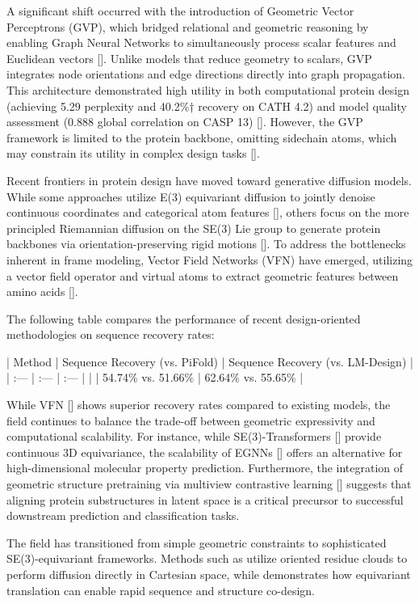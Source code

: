 \documentclass[11pt]{article}
\begin{document}
A significant shift occurred with the introduction of Geometric Vector Perceptrons (GVP), which bridged relational and geometric reasoning by enabling Graph Neural Networks to simultaneously process scalar features and Euclidean vectors [\citep{2009.01411}]. Unlike models that reduce geometry to scalars, GVP integrates node orientations and edge directions directly into graph propagation. This architecture demonstrated high utility in both computational protein design (achieving 5.29 perplexity and 40.2\%† recovery on CATH 4.2) and model quality assessment (0.888 global correlation on CASP 13) [\citep{2009.01411}]. However, the GVP framework is limited to the protein backbone, omitting sidechain atoms, which may constrain its utility in complex design tasks [\citep{2009.01411}].

Recent frontiers in protein design have moved toward generative diffusion models. While some approaches utilize E(3) equivariant diffusion to jointly denoise continuous coordinates and categorical atom features [\citep{2203.17003}], others focus on the more principled Riemannian diffusion on the SE(3) Lie group to generate protein backbones via orientation-preserving rigid motions [\citep{2302.02277}]. To address the bottlenecks inherent in frame modeling, Vector Field Networks (VFN) have emerged, utilizing a vector field operator and virtual atoms to extract geometric features between amino acids [\citep{2310.11802}].

The following table compares the performance of recent design-oriented methodologies on sequence recovery rates:

| Method | Sequence Recovery (vs. PiFold) | Sequence Recovery (vs. LM-Design) |
| :--- | :--- | :--- |
| \citep{2310.11802} | 54.74\% vs. 51.66\% | 62.64\% vs. 55.65\% |

While VFN [\citep{2310.11802}] shows superior recovery rates compared to existing models, the field continues to balance the trade-off between geometric expressivity and computational scalability. For instance, while SE(3)-Transformers [\citep{2006.10503}] provide continuous 3D equivariance, the scalability of EGNNs [\citep{2102.09844}] offers an alternative for high-dimensional molecular property prediction. Furthermore, the integration of geometric structure pretraining via multiview contrastive learning [\citep{2203.06125}] suggests that aligning protein substructures in latent space is a critical precursor to successful downstream prediction and classification tasks.

The field has transitioned from simple geometric constraints to sophisticated SE(3)-equivariant frameworks. Methods such as \citep{2301.12485} utilize oriented residue clouds to perform diffusion directly in Cartesian space, while \citep{2210.08761} demonstrates how equivariant translation can enable rapid sequence and structure co-design.
\end{document}
